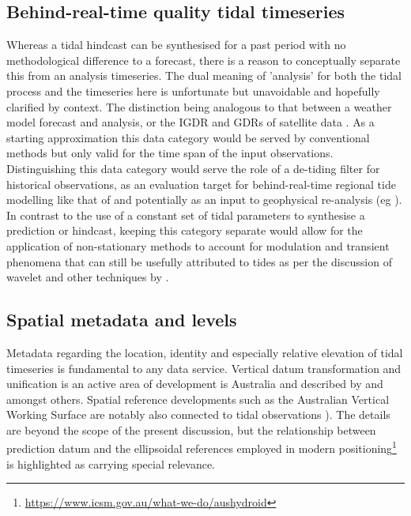 \subsection{Behind-real-time quality tidal timeseries}  
\label{Sec:flavour3} 
Whereas a tidal hindcast can be synthesised for a past period with no methodological difference to a forecast, there is a reason to conceptually separate this from an analysis timeseries. The dual meaning of 'analysis' for both the tidal process and the timeseries here is unfortunate but unavoidable and hopefully clarified by context. 
The distinction being analogous to that between a weather model forecast and analysis, or the IGDR and GDRs of satellite data \citep{Picot:2003tp}.    As a starting approximation this data category would be served by conventional methods but only valid for the time span of the input observations. 
Distinguishing this data category would serve the role of a de-tiding filter for historical observations, as an evaluation target for behind-real-time regional tide modelling like that of \citeauthor{10.5194/os-2020-107} and potentially as an input to geophysical re-analysis (eg \citep{10.1029/2017jc013685}).    
In contrast to the use of a constant set of tidal parameters to synthesise a prediction or hindcast, keeping this category separate would allow for the application of non-stationary methods to account for modulation and transient phenomena that can still be usefully attributed to tides as per the discussion of wavelet and other techniques by \citeauthor{Flinchem:2000kp}. 

\subsection{Spatial metadata and levels}
\label{sec:spatial}
Metadata regarding the location, identity and especially relative elevation of tidal timeseries is fundamental to any data service.
Vertical datum transformation and unification is an active area of development is Australia and described by  \citeauthor{Keysers:we} and \citeauthor{Filmer:2018cu} amongst others.   Spatial reference developments such as the Australian Vertical Working Surface are notably also connected to tidal observations \citep{AVWS2021}).   The details are beyond the scope of the present discussion, but the relationship between prediction datum and the ellipsoidal references employed in modern positioning\footnote{\url{ https://www.icsm.gov.au/what-we-do/aushydroid}} is highlighted as carrying special relevance.

